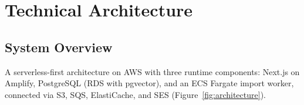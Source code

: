 \documentclass[12pt,a4paper]{article}
\begin{document}
\section{Technical Architecture}
\label{sec:architecture}

\subsection{System Overview}

A serverless-first architecture on AWS with three runtime components: Next.js on Amplify, PostgreSQL (RDS with pgvector), and an ECS Fargate import worker, connected via S3, SQS, ElastiCache, and SES (Figure~\ref{fig:architecture}).
\end{document}

